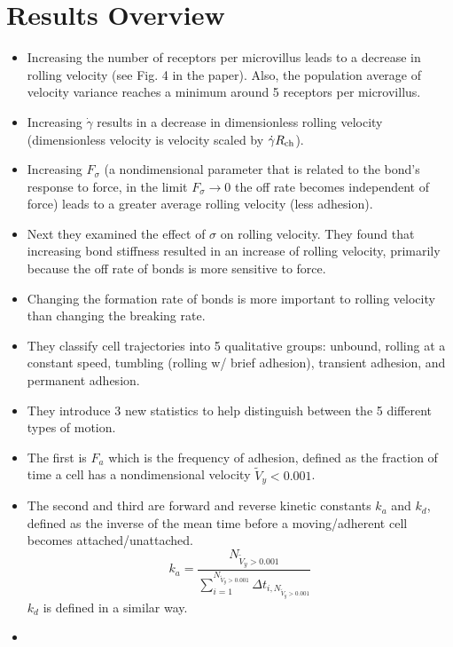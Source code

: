 \documentclass[
10pt, %
letterpaper, %
twocolumn, %
landscape %
]{article}
\newcommand{\ch}{\textnormal{ch}}
\begin{document}

\section{Results Overview}

\begin{itemize}
\item Increasing the number of receptors per microvillus leads to a
  decrease in rolling velocity (see Fig. 4 in the paper). Also, the
  population average of velocity variance reaches a minimum around 5
  receptors per microvillus.
\item Increasing $\dot{\gamma}$ results in a decrease in dimensionless
  rolling velocity (dimensionless velocity is velocity scaled by
  $\dot{\gamma} R_\ch$).
\item Increasing $F_\sigma$ (a nondimensional parameter that is
  related to the bond's response to force, in the limit $F_\sigma
  \rightarrow 0$ the off rate becomes independent of force) leads to a
  greater average rolling velocity (less adhesion). 
\item Next they examined the effect of $\sigma$ on rolling
  velocity. They found that increasing bond stiffness resulted in an
  increase of rolling velocity, primarily because the off rate of
  bonds is more sensitive to force.
\item Changing the formation rate of bonds is more important to
  rolling velocity than changing the breaking rate.
\item They classify cell trajectories into 5 qualitative groups:
  unbound, rolling at a constant speed, tumbling (rolling w/ brief
  adhesion), transient adhesion, and permanent adhesion.
\item They introduce 3 new statistics to help distinguish between the
  5 different types of motion.
\item The first is $F_a$ which is the frequency of adhesion, defined
  as the fraction of time a cell has a nondimensional velocity
  $\tilde{V}_y < 0.001$.
\item The second and third are forward and reverse kinetic constants
  $k_a$ and $k_d$, defined as the inverse of the mean time before a
  moving/adherent cell becomes attached/unattached.
  \begin{equation}
    \label{eq:forward_kin_const}
    k_a = \frac{N_{\tilde{V}_y > 0.001}}{\sum_{i = 1}^{N_{\tilde{V}_y
          > 0.001}} \Delta t_{i, N_{\tilde{V}_y > 0.001}}} 
  \end{equation}
  $k_d$ is defined in a similar way.
\item 
\end{itemize}
\end{document}
